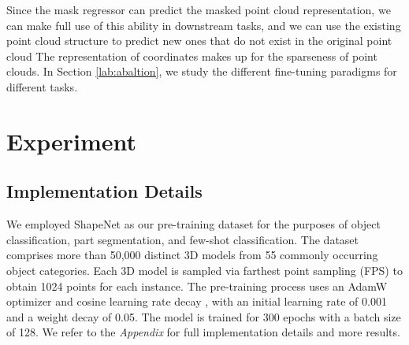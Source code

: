 \documentclass[sigconf, screen]{acmart}
\begin{document}
Since the mask regressor can predict the masked point cloud representation, we can make full use of this ability in downstream tasks, and we can use the existing point cloud structure to predict new ones that do not exist in the original point cloud  The representation of coordinates makes up for the sparseness of point clouds. 
In Section \ref{lab:abaltion}, we study the different fine-tuning paradigms for different tasks.


\section{Experiment}
\subsection{Implementation Details}
We employed ShapeNet \cite{chang2015shapenet} as our pre-training dataset for the purposes of object classification, part segmentation, and few-shot classification. 
The dataset comprises more than 50,000 distinct 3D models from 55 commonly occurring object categories. 
Each 3D model is sampled via farthest point sampling (FPS) to obtain 1024 points for each instance. The pre-training process uses an AdamW optimizer \cite{loshchilov2017decoupled} and cosine learning rate decay \cite{loshchilov2016sgdr}, with an initial learning rate of 0.001 and a weight decay of 0.05. 
The model is trained for 300 epochs with a batch size of 128.
We refer to the {\it Appendix} for { full implementation details} and more results.
\end{document}
